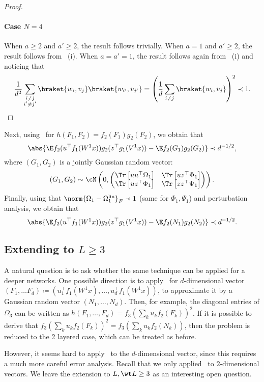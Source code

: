 \begin{proof}
\paragraph{Case \(N = 4\)}
When \(a \geq 2\) and \(a' \geq 2\), the result follows trivially.
When \(a = 1\) and \(a' \geq 2\), the result follows from~ (i).
When \(a = a' = 1\), the result follows again from~ (i) and noticing that 
\begin{equation}
    \frac{1}{d^2} \sum_{\substack{i \neq j \\ i' \neq j'}} \braket{w_i, v_j} \braket{w_{i'}, v_{j'}} = \left(\frac{1}{d} \sum_{i \neq j} \braket{w_i, v_j}\right)^2 \prec 1.
\end{equation}
\end{proof}
Next, using~ for \(h(F_1, F_2) = f_2(F_1)g_2(F_2)\), we obtain that 
\begin{equation}
    \abs{\E f_2(u^\top f_1(W^1 x)) g_2(z^\top g_1(V^1 x)) - \E f_2(G_1) g_2(G_2)} \prec d^{-1/2},
\end{equation}
where \((G_1, G_2)\) is a jointly Gaussian random vector:
    \begin{equation}
        (G_1, G_2) \sim \cN \left(0,  \begin{pmatrix} \Tr \left[u u^\top \Omega_1 \right] & \Tr \left[u z^\top \Phi_1 \right]\\ \Tr \left[u z^\top \Phi_1 \right] & \Tr \left[z z^\top \Psi_1 \right] \end{pmatrix} \right).
\end{equation}
Finally, using that \(\norm{\Omega_1 - \Omega_1^{\mathrm{lin}}}_F \prec 1\) (same for \(\Phi_1, \Psi_1\)) and perturbation analysis, we obtain that 
\begin{equation}
    \abs{\E f_2(u^\top f_1(W^1 x)) g_2(z^\top g_1(V^1 x)) - \E f_2(N_1) g_2(N_2)} \prec d^{-1/2}.
\end{equation}

\subsection{Extending to \(L \geq 3\)}
A natural question is to ask whether the same technique can be applied for a deeper networks. One possible direction is to apply~ for \(d\)-dimensional vector \((F_1, \ldots F_d) \coloneqq (u_1^\top f_1(W^1 x), \ldots, u_d^\top f_1(W^1 x))\), to approximate it by a Gaussian random vector \((N_1, \ldots, N_d)\). Then, for example, the diagonal entries of \(\Omega_3\) can be written as \(h(F_1, \ldots, F_d) = f_3(\sum_{k} u_k f_2(F_k))^2\). If it is possible to derive that \(f_3(\sum_{k} u_k f_2(F_k))^2 = f_3(\sum_k u_k f_2(N_k))\), then the problem is reduced to the 2 layered case, which can be treated as before.

However, it seems hard to apply~ to the \(d\)-dimensional vector, since this requires a much more careful error analysis. Recall that we only applied~ to \(2\)-dimensional vectors. We leave the extension to \(L, \wt L \geq 3\) as an interesting open question.